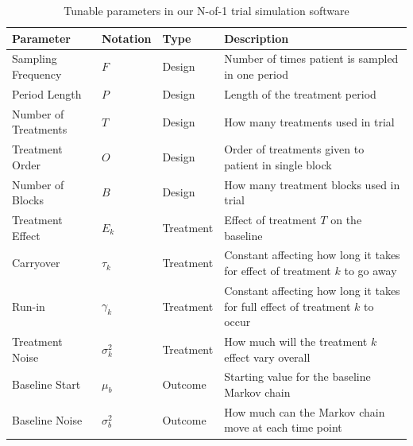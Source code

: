 \documentclass[11pt,]{article}
\begin{document}
\begin{table}[t]

\caption{\label{tab:params-table}Tunable parameters in our N-of-1 trial simulation software}
\centering
\fontsize{9}{11}\selectfont
\begin{tabu} to 
\toprule
Parameter & Notation & Type & Description\\
\midrule
{}  Sampling Frequency & $F$ & Design & Number of times patient is sampled in one period\\
 
Period Length & $P$ & Design & Length of the treatment period\\
 
  Number of Treatments & $T$ & Design & How many treatments used in trial\\
 
Treatment Order & $O$ & Design & Order of treatments given to patient in single block\\
 
  Number of Blocks & $B$ & Design & How many treatment blocks used in trial\\
 
Treatment Effect & $E_k$ & Treatment & Effect of treatment $T$ on the baseline\\
 
  Carryover & $\tau_k$ & Treatment & Constant affecting how long it takes for effect of treatment $k$ to go away\\
 
Run-in & $\gamma_k$ & Treatment & Constant affecting how long it takes for full effect of treatment $k$ to occur\\
 
  Treatment Noise & $\sigma^2_k$ & Treatment & How much will the treatment $k$ effect vary overall\\
 
Baseline Start & $\mu_b$ & Outcome & Starting value for the baseline Markov chain\\
 
  Baseline Noise & $\sigma^2_b$ & Outcome & How much can the Markov chain move at each time point\\
\bottomrule
\end{tabu}
\end{table}
\end{document}
